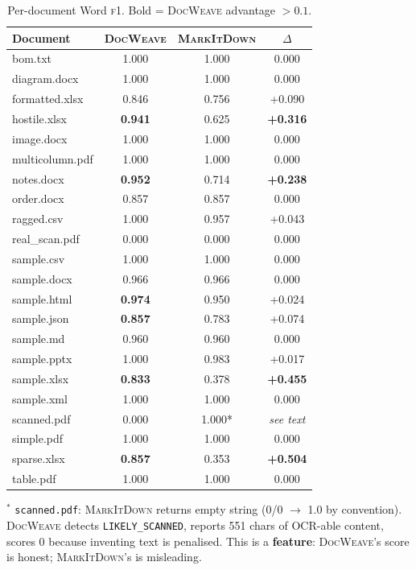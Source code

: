 \documentclass[10pt, conference, compsocconf]{IEEEtran}
\theoremstyle{plain}
\newcommand{\docweave}{\textsc{DocWeave}}
\newcommand{\markitdown}{\textsc{MarkItDown}}
\newcommand{\fone}{\textsc{f1}}
\begin{document}
\begin{table}[H]
\centering
\caption{Per-document Word \fone{}. Bold = \docweave{} advantage $>0.1$.}
\label{tab:per-doc-f1}
\begin{tabular}{@{}lccc@{}}
\toprule
\textbf{Document} & \textbf{\docweave{}} & \textbf{\markitdown{}} & \textbf{$\Delta$} \\
\midrule
bom.txt          & 1.000 & 1.000 & 0.000 \\
diagram.docx     & 1.000 & 1.000 & 0.000 \\
formatted.xlsx   & 0.846 & 0.756 & +0.090 \\
hostile.xlsx     & \textbf{0.941} & 0.625 & \textbf{+0.316} \\
image.docx       & 1.000 & 1.000 & 0.000 \\
multicolumn.pdf  & 1.000 & 1.000 & 0.000 \\
notes.docx       & \textbf{0.952} & 0.714 & \textbf{+0.238} \\
order.docx       & 0.857 & 0.857 & 0.000 \\
ragged.csv       & 1.000 & 0.957 & +0.043 \\
real\_scan.pdf    & 0.000 & 0.000 & 0.000 \\
sample.csv       & 1.000 & 1.000 & 0.000 \\
sample.docx      & 0.966 & 0.966 & 0.000 \\
sample.html      & \textbf{0.974} & 0.950 & +0.024 \\
sample.json      & \textbf{0.857} & 0.783 & +0.074 \\
sample.md        & 0.960 & 0.960 & 0.000 \\
sample.pptx      & 1.000 & 0.983 & +0.017 \\
sample.xlsx      & \textbf{0.833} & 0.378 & \textbf{+0.455} \\
sample.xml       & 1.000 & 1.000 & 0.000 \\
scanned.pdf      & 0.000 & 1.000* & \textit{see text} \\
simple.pdf       & 1.000 & 1.000 & 0.000 \\
sparse.xlsx      & \textbf{0.857} & 0.353 & \textbf{+0.504} \\
table.pdf        & 1.000 & 1.000 & 0.000 \\
\bottomrule
\end{tabular}
\end{table}

$^*$ \texttt{scanned.pdf}: \markitdown{} returns empty string (0/0 $\to$ 1.0 by convention). \docweave{} detects \texttt{LIKELY\_SCANNED}, reports 551 chars of OCR-able content, scores 0 because inventing text is penalised. This is a \textbf{feature}: \docweave{}'s score is honest; \markitdown{}'s is misleading.
\end{document}
